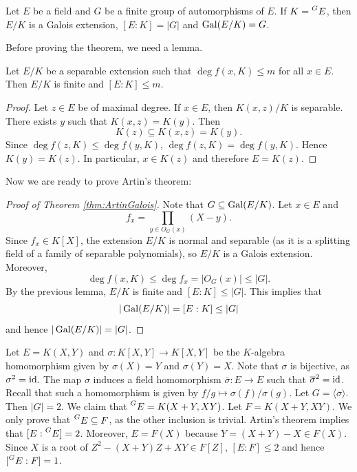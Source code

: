 \begin{theorem}[Artin]
\label{thm:ArtinGalois}
    Let $E$ be a field and $G$ be a finite group of automorphisms of $E$. 
    If $K=\prescript{G}{}{E}$, then $E/K$ is a Galois extension,
    $[E:K]=|G|$ and $\operatorname{Gal}(E/K)=G$. 
\end{theorem}

Before proving the theorem, we need a lemma.

\begin{lemma}
    Let $E/K$ be a separable extension such that $\deg f(x,K)\leq m$
    for all $x\in E$. Then $E/K$ is finite and $[E:K]\leq m$. 
\end{lemma}

\begin{proof}
   Let $z\in E$ be of maximal degree. If $x\in E$, 
   then $K(x,z)/K$ is separable. There exists $y$ such that $K(x,z)=K(y)$. Then 
   \[
   K(z)\subseteq K(x,z)=K(y).
   \]
   Since 
   $\deg f(z,K)\leq\deg f(y,K)$, 
   $\deg f(z,K)=\deg f(y,K)$. Hence 
   $K(y)=K(z)$. In particular, $x\in K(z)$ and
   therefore $E=K(z)$. 
\end{proof}

Now we are ready to prove Artin's theorem: 

\begin{proof}[Proof of Theorem \ref{thm:ArtinGalois}]
    Note that $G\subseteq\operatorname{Gal}(E/K)$. Let $x\in E$ and 
    \[
    f_x=\prod_{y\in O_G(x)}(X-y).
    \]
    Since $f_x\in K[X]$, the extension $E/K$ is normal and separable (as it is a splitting
    field of a family of separable polynomials), so $E/K$ is a Galois extension. Moreover, 
    \[
    \deg f(x,K)\leq \deg f_x=|O_G(x)|\leq |G|.
    \]
    By the previous lemma, $E/K$ is finite and $[E:K]\leq |G|$. This
    implies that
    \[
    |\operatorname{Gal}(E/K)|=[E:K]\leq |G|
    \]
    and hence $|\operatorname{Gal}(E/K)|=|G|$. 
\end{proof}

\begin{example}
    Let $E=K(X,Y)$ and 
    $\sigma\colon K[X,Y]\to K[X,Y]$ be the $K$-algebra homomorphism given by $\sigma(X)=Y$ and $\sigma(Y)=X$. Note that $\sigma$ is bijective, as $\sigma^2=\operatorname{id}$. The map $\sigma$ induces
    a field homomorphism $\overline{\sigma}\colon E\to E$ such that 
    $\overline{\sigma}^2=\operatorname{id}$. Recall that such a homomorphism is given by 
    $f/g\mapsto \sigma(f)/\sigma(g)$. Let $G=\langle\overline{\sigma}\rangle$. Then $|G|=2$. 
    We claim that $\prescript{G}{}{E}=K(X+Y,XY)$. Let $F=K(X+Y,XY)$. We only prove
    that $\prescript{G}{}{E}\subseteq F$, as the other inclusion is trivial. Artin's theorem
    implies that $[E:\prescript{G}{}{E}]=2$. 
    Moreover, $E=F(X)$ because $Y=(X+Y)-X\in F(X)$.
    Since $X$ is a root of $Z^2-(X+Y)Z+XY\in F[Z]$,
    $[E:F]\leq2$ and hence $[\prescript{G}{}{E}:F]=1$.  
\end{example}
